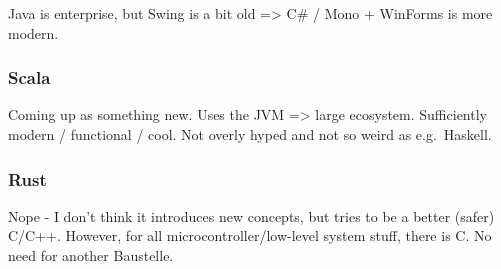 Java is enterprise, but Swing is a bit old =\textgreater{} C\# / Mono +
WinForms is more modern.

\subsubsection{Scala}\label{scala}

Coming up as something new. Uses the JVM =\textgreater{} large
ecosystem. Sufficiently modern / functional / cool. Not overly hyped and
not so weird as e.g.~Haskell.

\subsubsection{Rust}\label{rust}

Nope - I don't think it introduces new concepts, but tries to be a
better (safer) C/C++. However, for all microcontroller/low-level system
stuff, there is C. No need for another Baustelle.
